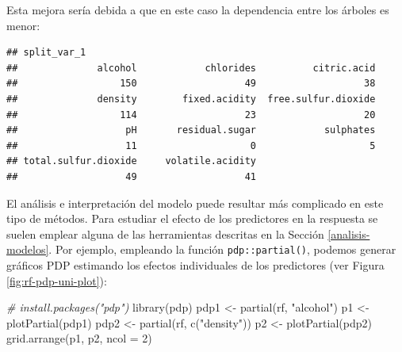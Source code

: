 \documentclass[
  spanish,
]{book}
\newenvironment{Shaded}{\begin{snugshade}}{\end{snugshade}}
\newcommand{\AttributeTok}[1]{\textcolor[rgb]{0.77,0.63,0.00}{#1}}
\newcommand{\CommentTok}[1]{\textcolor[rgb]{0.56,0.35,0.01}{\textit{#1}}}
\newcommand{\ConstantTok}[1]{\textcolor[rgb]{0.00,0.00,0.00}{#1}}
\newcommand{\ControlFlowTok}[1]{\textcolor[rgb]{0.13,0.29,0.53}{\textbf{#1}}}
\newcommand{\DecValTok}[1]{\textcolor[rgb]{0.00,0.00,0.81}{#1}}
\newcommand{\FunctionTok}[1]{\textcolor[rgb]{0.00,0.00,0.00}{#1}}
\newcommand{\NormalTok}[1]{#1}
\newcommand{\OtherTok}[1]{\textcolor[rgb]{0.56,0.35,0.01}{#1}}
\newcommand{\SpecialCharTok}[1]{\textcolor[rgb]{0.00,0.00,0.00}{#1}}
\newcommand{\StringTok}[1]{\textcolor[rgb]{0.31,0.60,0.02}{#1}}
\theoremstyle{break}
\theoremstyle{definition}
\theoremstyle{definition}
\theoremstyle{definition}
\theoremstyle{definition}
\theoremstyle{remark}
\begin{document}
Esta mejora sería debida a que en este caso la dependencia entre los árboles es menor:

\begin{Shaded}
\end{Shaded}

\begin{verbatim}
## split_var_1
##              alcohol            chlorides          citric.acid 
##                  150                   49                   38 
##              density        fixed.acidity  free.sulfur.dioxide 
##                  114                   23                   20 
##                   pH       residual.sugar            sulphates 
##                   11                    0                    5 
## total.sulfur.dioxide     volatile.acidity 
##                   49                   41
\end{verbatim}

El análisis e interpretación del modelo puede resultar más complicado en este tipo de métodos.
Para estudiar el efecto de los predictores en la respuesta se suelen emplear alguna de las herramientas descritas en la Sección \ref{analisis-modelos}.
Por ejemplo, empleando la función \texttt{pdp::partial()}, podemos generar gráficos PDP estimando los efectos individuales de los predictores (ver Figura \ref{fig:rf-pdp-uni-plot}):

\begin{Shaded}
\begin{Highlighting}[]
\CommentTok{\# install.packages("pdp")}
\FunctionTok{library}\NormalTok{(pdp)}
\NormalTok{pdp1 }\OtherTok{\textless{}{-}} \FunctionTok{partial}\NormalTok{(rf, }\StringTok{"alcohol"}\NormalTok{)}
\NormalTok{p1 }\OtherTok{\textless{}{-}} \FunctionTok{plotPartial}\NormalTok{(pdp1)}
\NormalTok{pdp2 }\OtherTok{\textless{}{-}} \FunctionTok{partial}\NormalTok{(rf, }\FunctionTok{c}\NormalTok{(}\StringTok{"density"}\NormalTok{))}
\NormalTok{p2 }\OtherTok{\textless{}{-}} \FunctionTok{plotPartial}\NormalTok{(pdp2)}
\FunctionTok{grid.arrange}\NormalTok{(p1, p2, }\AttributeTok{ncol =} \DecValTok{2}\NormalTok{)}
\end{Highlighting}
\end{Shaded}
\end{document}
